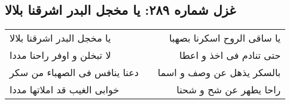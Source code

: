 \begin{center}
\section*{غزل شماره ۲۸۹: یا مخجل البدر اشرقنا بلالا}
\label{sec:0289}
\begin{longtable}{l p{0.5cm} r}
یا مخجل البدر اشرقنا بلالا
&&
یا ساقی الروح اسکرنا بصهبا
\\
لا تبخلن و اوفر راحنا مددا
&&
حتی تنادم فی اخذ و اعطا
\\
دعنا ینافس فی الصهباء من سکر
&&
بالسکر یذهل عن وصف و اسما
\\
خوابی الغیب قد املاتها مددا
&&
راحا یطهر عن شح و شحنا
\\
\end{longtable}
\end{center}
